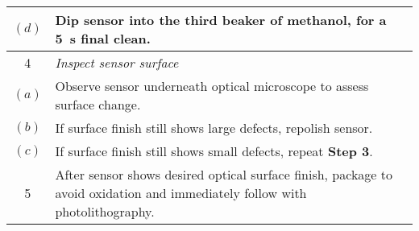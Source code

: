 \documentclass[../main.tex]{subfiles}%
\begin{document}
\begin{table}[p]
\begin{tabu}{ c p{5.00in} }
            $(d)$ & Dip sensor into the third beaker of \gls{methanol}, for a \SI{5}{\second} final clean.\\%
            \midrule%
            4 & \textit{Inspect sensor surface}\\%
            $(a)$ & Observe sensor underneath optical microscope to assess surface change.\\%
            $(b)$ & If surface finish still shows large defects, repolish sensor.\\%
            $(c)$ & If surface finish still shows small defects, repeat \textbf{Step 3}.\\%
            \midrule%
            5 & After sensor shows desired optical surface finish, package to avoid oxidation and immediately follow with photolithography.\\%
            \bottomrule%
        \end{tabu}%
    \end{table}%
\end{document}
